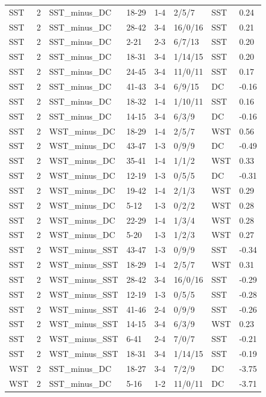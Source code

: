 \begin{table}[!h]
\begin{tabular}[t]{lrllllll}
SST & 2 & SST_minus_DC & 18-29 & 1-4 & 2/5/7 & SST & 0.24\\
SST & 2 & SST_minus_DC & 28-42 & 3-4 & 16/0/16 & SST & 0.21\\
\addlinespace
SST & 2 & SST_minus_DC & 2-21 & 2-3 & 6/7/13 & SST & 0.20\\
SST & 2 & SST_minus_DC & 18-31 & 3-4 & 1/14/15 & SST & 0.20\\
SST & 2 & SST_minus_DC & 24-45 & 3-4 & 11/0/11 & SST & 0.17\\
SST & 2 & SST_minus_DC & 41-43 & 3-4 & 6/9/15 & DC & -0.16\\
SST & 2 & SST_minus_DC & 18-32 & 1-4 & 1/10/11 & SST & 0.16\\
\addlinespace
SST & 2 & SST_minus_DC & 14-15 & 3-4 & 6/3/9 & DC & -0.16\\
SST & 2 & WST_minus_DC & 18-29 & 1-4 & 2/5/7 & WST & 0.56\\
SST & 2 & WST_minus_DC & 43-47 & 1-3 & 0/9/9 & DC & -0.49\\
SST & 2 & WST_minus_DC & 35-41 & 1-4 & 1/1/2 & WST & 0.33\\
SST & 2 & WST_minus_DC & 12-19 & 1-3 & 0/5/5 & DC & -0.31\\
\addlinespace
SST & 2 & WST_minus_DC & 19-42 & 1-4 & 2/1/3 & WST & 0.29\\
SST & 2 & WST_minus_DC & 5-12 & 1-3 & 0/2/2 & WST & 0.28\\
SST & 2 & WST_minus_DC & 22-29 & 1-4 & 1/3/4 & WST & 0.28\\
SST & 2 & WST_minus_DC & 5-20 & 1-3 & 1/2/3 & WST & 0.27\\
SST & 2 & WST_minus_SST & 43-47 & 1-3 & 0/9/9 & SST & -0.34\\
\addlinespace
SST & 2 & WST_minus_SST & 18-29 & 1-4 & 2/5/7 & WST & 0.31\\
SST & 2 & WST_minus_SST & 28-42 & 3-4 & 16/0/16 & SST & -0.29\\
SST & 2 & WST_minus_SST & 12-19 & 1-3 & 0/5/5 & SST & -0.28\\
SST & 2 & WST_minus_SST & 41-46 & 2-4 & 0/9/9 & SST & -0.26\\
SST & 2 & WST_minus_SST & 14-15 & 3-4 & 6/3/9 & WST & 0.23\\
\addlinespace
SST & 2 & WST_minus_SST & 6-41 & 2-4 & 7/0/7 & SST & -0.21\\
SST & 2 & WST_minus_SST & 18-31 & 3-4 & 1/14/15 & SST & -0.19\\
WST & 2 & SST_minus_DC & 18-27 & 3-4 & 7/2/9 & DC & -3.75\\
WST & 2 & SST_minus_DC & 5-16 & 1-2 & 11/0/11 & DC & -3.71\\

\end{tabular}
\end{table}
